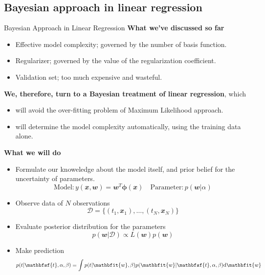 \documentclass{bredelebeamer}
\begin{document}
\subsection{Bayesian approach in linear regression}
\begin{frame}{Bayesian Approach in Linear Regression}
  \textbf{What we've discussed so far} \\
  \begin{itemize}
    \item Effective model complexity; governed by the number of basis function.
    \item Regularizer; governed by the value of the regularization coefficient.
    \item Validation set; too much expensive and wasteful.
  \end{itemize}

  \vspace{0.5\baselineskip}
  \textbf{We, therefore, turn to a Bayesian treatment of linear regression}, which \\
  \begin{itemize}
    \item will avoid the over-fitting problem of Maximum Likelihood approach.
    \item will determine the model complexity automatically, using the training
          data alone.
  \end{itemize}

  \vspace{0.5\baselineskip}
  \textbf{What we will do} \\
  \begin{itemize}
    \item Formulate our knoweledge about the model itself, and prior belief for the
     uncertainty of parameters.
     \begin{equation}
         \textrm{Model}: y(\mathbfit{x},\mathbfit{w}) = \mathbfit{w}^T \boldsymbol{\phi}(\mathbfit{x}) \quad
         \textrm{Parameter}: p(\mathbfit{w}|\alpha)
     \end{equation}
    \item Observe data of $N$ observations
    \begin{equation}
      \mathcal{D} = \{(t_1, \mathbfit{x}_1), \ldots, (t_N, \mathbfit{x}_N)\}
    \end{equation}
    \item Evaluate posterior distribution for the parameters
    \begin{equation}
      p(\mathbfit{w}|\mathcal{D}) \propto L(\mathbfit{w}) p(\mathbfit{w})
    \end{equation}
    \item Make prediction
    \begin{equation}
      p(t|\mathbfsf{t}, \alpha, \beta) = \int p(t|\mathbfit{w},\beta) p(\mathbfit{w}|\mathbfsf{t}, \alpha, \beta) \mathrm{d}\mathbfit{w}
    \end{equation}
  \end{itemize}
\end{frame}
\end{document}

